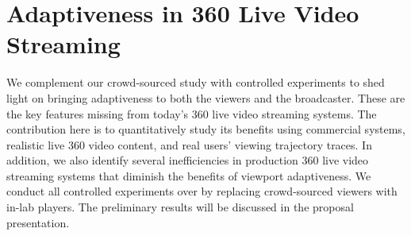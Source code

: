 \section{Adaptiveness in 360\degree{} Live Video Streaming}

We complement our crowd-sourced study with controlled
experiments to shed light on bringing adaptiveness to both
the viewers and the broadcaster. These are the key features
missing from today’s 360\degree{} live video streaming systems. The contribution here
is to quantitatively study its benefits using commercial systems,
realistic live 360\degree{} video content, and real users’ viewing trajectory
traces. In addition, we also identify several inefficiencies in production
360\degree{} live video streaming systems that diminish the benefits of
viewport adaptiveness. We conduct all controlled experiments over
\lime by replacing crowd-sourced viewers with in-lab players. The preliminary results will be discussed in the proposal presentation.
